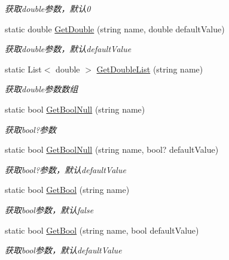 \begin{DoxyCompactItemize}
\begin{DoxyCompactList}\small\item\em 获取double参数，默认0 \end{DoxyCompactList}\item 
static double \hyperlink{class_x_c_l_net_tools_1_1_string_hander_1_1_form_helper_a36ebb953cd52bbb1e999c98a163bd05a}{Get\+Double} (string name, double default\+Value)
\begin{DoxyCompactList}\small\item\em 获取double参数，默认default\+Value \end{DoxyCompactList}\item 
static List$<$ double $>$ \hyperlink{class_x_c_l_net_tools_1_1_string_hander_1_1_form_helper_a3e7cff936c30c0bdc0c61f2c34ca942d}{Get\+Double\+List} (string name)
\begin{DoxyCompactList}\small\item\em 获取double参数数组 \end{DoxyCompactList}\item 
static bool \hyperlink{class_x_c_l_net_tools_1_1_string_hander_1_1_form_helper_aaae65e05af2afe209759febba7ecdbd3}{Get\+Bool\+Null} (string name)
\begin{DoxyCompactList}\small\item\em 获取bool?参数 \end{DoxyCompactList}\item 
static bool \hyperlink{class_x_c_l_net_tools_1_1_string_hander_1_1_form_helper_ac3031b54d5d53e4e21a72d8b3346e53a}{Get\+Bool\+Null} (string name, bool? default\+Value)
\begin{DoxyCompactList}\small\item\em 获取bool?参数，默认default\+Value \end{DoxyCompactList}\item 
static bool \hyperlink{class_x_c_l_net_tools_1_1_string_hander_1_1_form_helper_a4eff1989f45cc5ae4608ba374956be17}{Get\+Bool} (string name)
\begin{DoxyCompactList}\small\item\em 获取bool参数，默认false \end{DoxyCompactList}\item 
static bool \hyperlink{class_x_c_l_net_tools_1_1_string_hander_1_1_form_helper_a449ca945de8a73643ac54eab5e37a3ef}{Get\+Bool} (string name, bool default\+Value)
\begin{DoxyCompactList}\small\item\em 获取bool参数，默认default\+Value \end{DoxyCompactList}\item 

\end{DoxyCompactItemize}

